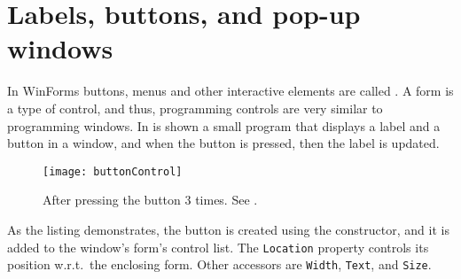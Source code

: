 
\section{Labels, buttons, and pop-up windows}
In WinForms buttons, menus and other interactive elements are called . A form is a type of control, and thus, programming controls are very similar to programming windows. In  is shown a small program that displays a label and a button in a window, and when the button is pressed, then the label is updated.
%
%
\begin{figure}
  \centering
  \texttt{[image: buttonControl]}
  \caption{After pressing the button 3 times. See .}
  \label{fig:buttonControl}
\end{figure}
%
As the listing demonstrates, the button is created using the  constructor, and it is added to the window's form's control list. The \lstinline{Location} property controls its position w.r.t.\ the enclosing form. Other accessors are \lstinline{Width}, \lstinline{Text}, and \lstinline{Size}.

